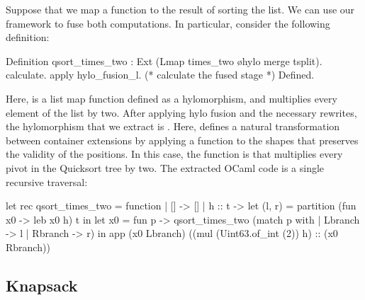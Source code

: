 \documentclass[anonymous, a4paper, UKenglish, cleveref, autoref, thm-restate]{lipics-v2021}
\begin{document}
Suppose that we map a function to the result of sorting the list. We can
use our framework to fuse both computations. In particular, consider
the following definition:
\begin{coqcode}
Definition qsort_times_two : Ext (Lmap times_two \o hylo merge tsplit).
  calculate.  apply hylo_fusion_l. 
  (* calculate the fused stage *)
Defined.
\end{coqcode}
Here,  is a list map function defined as a hylomorphism,
and  multiplies every element of the list by two.
After applying hylo fusion and the necessary rewrites, the hylomorphism that we
extract is 
. Here,  defines
a natural transformation between container extensions by applying a function
to the shapes that preserves the validity of the positions. In this case,
the function is  that multiplies every pivot in the Quicksort
tree by two. The extracted OCaml code is a single recursive traversal:
\begin{ocamlcode}
let rec qsort_times_two = function
| [] -> []
| h :: t ->
  let (l, r) = partition (fun x0 -> leb x0 h) t in
  let x0 = fun p -> qsort_times_two (match p with
                                     | Lbranch -> l
                                     | Rbranch -> r) in
  app (x0 Lbranch) ((mul (Uint63.of_int (2)) h) :: (x0 Rbranch))
\end{ocamlcode}

\subsection{Knapsack}
\end{document}
